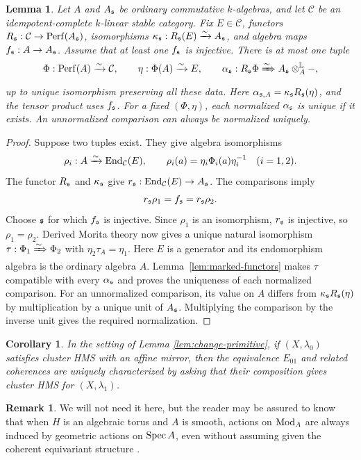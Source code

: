 \documentclass[12pt, letter]{amsart}
\newtheorem{lemma}[theorem]{Lemma}
\newtheorem{corollary}[theorem]{Corollary}
\theoremstyle{definition}
\newtheorem{remark}[theorem]{Remark}
\numberwithin{equation}{section}
\begin{document}
\begin{lemma}\label{lem:normalized-hms-unique}
Let $A$ and $A_{\mathfrak{s}}$ be ordinary commutative $k$-algebras, and let
$\mathcal C$ be an idempotent-complete $k$-linear stable category.
Fix $E\in\mathcal C$,  functors
$R_{\mathfrak{s}}:\mathcal C\to\mathrm{Perf}(A_{\mathfrak{s}})$, isomorphisms
$\kappa_{\mathfrak{s}}:R_{\mathfrak{s}}(E)\xrightarrow{\sim}A_{\mathfrak{s}}$, and algebra maps $f_{\mathfrak{s}}:A\to A_{\mathfrak{s}}$.
Assume that at least one $f_{\mathfrak{s}}$ is injective.
There is at most one tuple
\[
 \Phi:\mathrm{Perf}(A)\xrightarrow{\sim}\mathcal C,\qquad
 \eta:\Phi(A)\xrightarrow{\sim}E,\qquad
 \alpha_{\mathfrak{s}}:R_{\mathfrak{s}}\Phi\xRightarrow{\sim}A_{\mathfrak{s}}\otimes_A^{\mathbb L}-,
\]
up to unique isomorphism preserving all these data. Here  $\alpha_{\mathfrak{s},A}=\kappa_{\mathfrak{s}}R_{\mathfrak{s}}(\eta)$, and the tensor
product uses $f_{\mathfrak{s}}$.
For a fixed $(\Phi,\eta)$, each normalized $\alpha_{\mathfrak{s}}$ is unique if it exists.
An unnormalized comparison can always be normalized uniquely.
\end{lemma}
\begin{proof}
Suppose two tuples exist. They give algebra isomorphisms
\[
 \rho_i:A\xrightarrow{\sim}\operatorname{End}_{\mathcal C}(E),\qquad
 \rho_i(a)=\eta_i\Phi_i(a)\eta_i^{-1}\quad(i=1,2).
\]
The functor $R_{\mathfrak{s}}$ and $\kappa_{\mathfrak{s}}$ give
$r_{\mathfrak{s}}:\operatorname{End}_{\mathcal C}(E)\to A_{\mathfrak{s}}$. The comparisons imply
\[
 r_{\mathfrak{s}}\rho_1=f_{\mathfrak{s}}=r_{\mathfrak{s}}\rho_2.
\]
Choose $\mathfrak{s}$ for which $f_{\mathfrak{s}}$ is injective. Since $\rho_1$ is an
isomorphism, $r_{\mathfrak{s}}$ is injective, so $\rho_1=\rho_2$.
Derived Morita theory now gives a unique natural isomorphism
$\tau:\Phi_1\xRightarrow{\sim}\Phi_2$ with
$\eta_2\tau_A=\eta_1$. Here $E$ is a generator and its endomorphism
algebra is the ordinary algebra $A$.
Lemma~\ref{lem:marked-functors} makes $\tau$ compatible with every
$\alpha_{\mathfrak{s}}$ and proves the uniqueness of each normalized comparison.
For an unnormalized comparison, its value on $A$ differs from
$\kappa_{\mathfrak{s}}R_{\mathfrak{s}}(\eta)$ by multiplication by a unique unit of $A_{\mathfrak{s}}$.
Multiplying the comparison by the inverse unit gives the required normalization.
\end{proof}


\begin{corollary}
    In the setting of Lemma \ref{lem:change-primitive}, if  $(X, \lambda_0)$ satisfies cluster HMS with an affine mirror, then the equivalence $E_{01}$ and related coherences are uniquely characterized by asking that their composition gives cluster HMS for $(X, \lambda_1)$. 
\end{corollary}

\begin{remark}
    We will not need it here, but the reader may be assured to know that when $H$ is an algebraic torus and $A$ is smooth, actions on $\operatorname{Mod}_A$ are always induced by geometric actions on $\operatorname{Spec} A$, even without assuming given the coherent equivariant structure \cite[Lemma~C.1]{HS}.
\end{remark}
\end{document}
